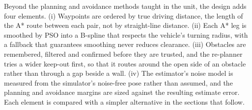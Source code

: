 Beyond the planning and avoidance methods taught in the unit, the
design adds four elements. (i) Waypoints are ordered by true driving
distance, the length of the A* route between each pair, not by
straight-line distance. (ii) Each A* leg is smoothed by PSO into a
B-spline that respects the vehicle's turning radius, with a fallback
that guarantees smoothing never reduces clearance. (iii) Obstacles are
remembered, filtered and confirmed before they are trusted, and the
re-planner tries a wider keep-out first, so that it routes around the
open side of an obstacle rather than through a gap beside a wall.
(iv) The estimator's noise model is measured from the simulator's
noise-free pose rather than assumed, and the planning and avoidance
margins are sized against the resulting estimate error. Each element is
compared with a simpler alternative in the sections that follow.

